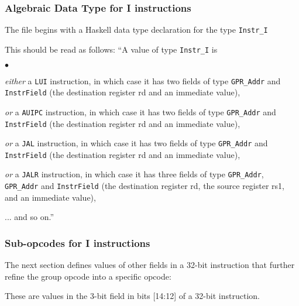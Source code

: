 \documentclass[11pt]{article}
\newenvironment{tightlist}%
{\begin{list}{$\bullet$}{%
    \setlength{\topsep}{0in}
    \setlength{\partopsep}{0in}
    \setlength{\itemsep}{0in}
    \setlength{\parsep}{0in}
    \setlength{\leftmargin}{1.5em}
    \setlength{\rightmargin}{0in}
    \setlength{\itemindent}{0in}
}
}%
{\end{list}
}
\begin{document}
\label{sec_ISA_spec_I}


\subsubsection{Algebraic Data Type for I instructions}

The file begins with a Haskell data type declaration for the type
\verb|Instr_I|



This should be read as follows: ``A value of type \verb|Instr_I| is
\begin{tightlist}

\item \emph{either} a \verb|LUI| instruction, in which case it has two
fields of type \verb|GPR_Addr| and
\verb|InstrField| (the destination register rd and an immediate value),

\item \emph{or} a \verb|AUIPC| instruction, in which case it has two
fields of type \verb|GPR_Addr| and \verb|InstrField| (the destination
register rd and an immediate value),

\item \emph{or} a \verb|JAL| instruction, in which case it has two
fields of type \verb|GPR_Addr| and \verb|InstrField| (the destination
register rd and an immediate value),

\item \emph{or} a \verb|JALR| instruction, in which case it has three
fields of type \verb|GPR_Addr|, \verb|GPR_Addr| and \verb|InstrField|
(the destination register rd, the source register rs1, and an
immediate value),

\item ... and so on.''

\end{tightlist}


\subsubsection{Sub-opcodes for I instructions}

The next section defines values of other fields in a 32-bit
instruction that further refine the group opcode into a specific
opcode:



These are values in the 3-bit field in bits [14:12] of a 32-bit instruction.
\end{document}
